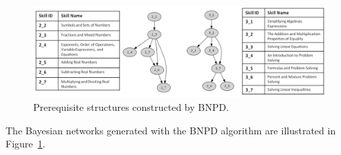 \documentclass{edm_template}
\newcommand{\hl}[1]{\colorbox{yellow}{#1}}
\begin{document}
{			\begin{figure}[!th]
				\begin{center}
					\centering
					\includegraphics[width=1.0\linewidth]{figures/hed_structures.png}
				\end{center}
				\caption{Prerequisite structures constructed by BNPD.}
				\label{fig:hed-structures} 
			\end{figure}
	
	The Bayesian networks generated with the BNPD algorithm are illustrated in Figure~\ref{fig:hed-structures}.
	

	
}
\end{document}
